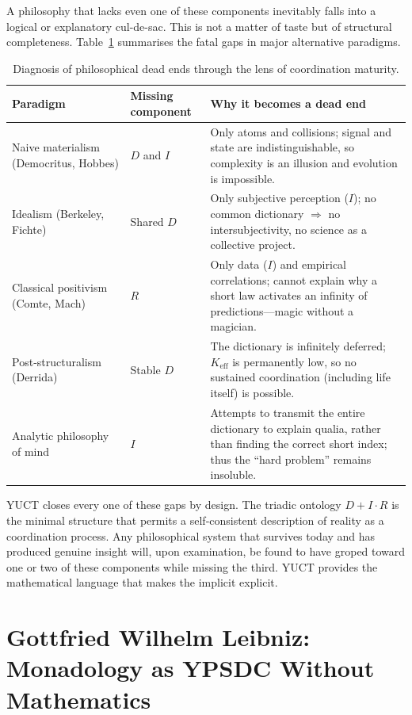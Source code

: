 \documentclass[12pt,a4paper]{article}
\newcommand{\Keff}{K_{\mathrm{eff}}}
\begin{document}
	A philosophy that lacks even one of these components inevitably falls into a logical or explanatory cul-de-sac. This is not a matter of taste but of structural completeness. Table~\ref{tab:dead-ends} summarises the fatal gaps in major alternative paradigms.
	
	\begin{table}[htbp]
		\centering
		\caption{Diagnosis of philosophical dead ends through the lens of coordination maturity.}
		\label{tab:dead-ends}
		\small
		\begin{tabular}{p{3cm} p{5.5cm} p{5.5cm}}
			\toprule
			\textbf{Paradigm} & \textbf{Missing component} & \textbf{Why it becomes a dead end} \\
			\midrule
			Naive materialism (Democritus, Hobbes) & \(D\) and \(I\) & Only atoms and collisions; signal and state are indistinguishable, so complexity is an illusion and evolution is impossible. \\
			Idealism (Berkeley, Fichte) & Shared \(D\) & Only subjective perception (\(I\)); no common dictionary \(\Rightarrow\) no intersubjectivity, no science as a collective project. \\
			Classical positivism (Comte, Mach) & \(R\) & Only data (\(I\)) and empirical correlations; cannot explain why a short law activates an infinity of predictions---magic without a magician. \\
			Post‑structuralism (Derrida) & Stable \(D\) & The dictionary is infinitely deferred; \(\Keff\) is permanently low, so no sustained coordination (including life itself) is possible. \\
			Analytic philosophy of mind & \(I\) & Attempts to transmit the entire dictionary to explain qualia, rather than finding the correct short index; thus the ``hard problem'' remains insoluble. \\
			\bottomrule
		\end{tabular}
	\end{table}
	
	YUCT closes every one of these gaps by design. The triadic ontology \(D + I \cdot R\) is the minimal structure that permits a self‑consistent description of reality as a coordination process. Any philosophical system that survives today and has produced genuine insight will, upon examination, be found to have groped toward one or two of these components while missing the third. YUCT provides the mathematical language that makes the implicit explicit.
	
	\section{Gottfried Wilhelm Leibniz: Monadology as YPSDC Without Mathematics}
	
\end{document}
